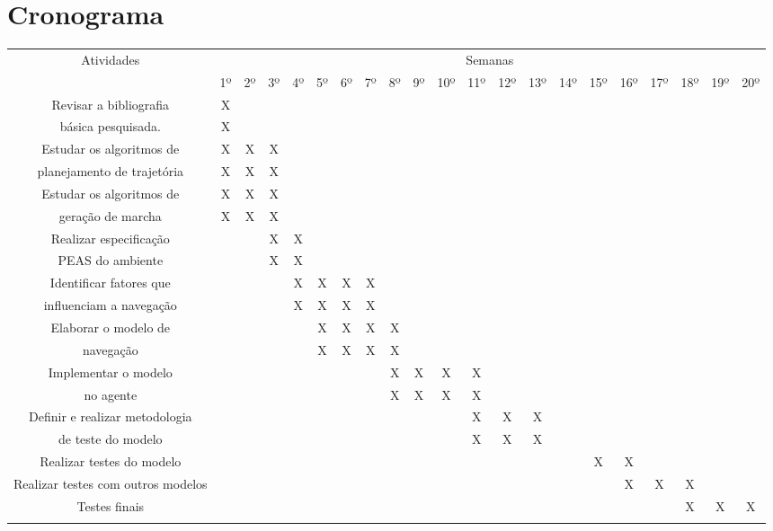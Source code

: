 \documentclass[font=plain]{abnt}
\begin{document}
\section{Cronograma}
\begin{landscape}
    
    
    \begin{tabular}{|c|| c c c c c c c c c c c c c c c c c c c c|} 
    \hline 
    Atividades & \multicolumn{20}{c|}{Semanas} \\ 
	       & 1º & 2º & 3º & 4º & 5º & 6º & 7º & 8º & 9º & 10º & 11º & 12º & 13º & 14º & 15º & 16º & 17º & 18º & 19º & 20º\\ 
    \hline 
    \hline 
    Revisar a bibliografia		&X& & & & & & & & & & & & & & & & & & &  \\%
    básica pesquisada.			&X&& & & & & & & & & & & & & & & & & &  \\
    \hline 
    Estudar os algoritmos de  		&X&X&X& & & & & & & & & & & & & & & & &  \\%
    planejamento de trajetória		&X&X&X& & & & & & & & & & & & & & & & &  \\
    \hline
    Estudar os algoritmos de 		&X&X&X& & & & & & & & & & & & & & & & &  \\%
    geração de marcha			&X&X&X& & & & & & & & & & & & & & & & &  \\
    \hline 
    Realizar especificação		& & &X&X& & & & & & & & & & & & & & & &  \\%
    PEAS do ambiente			& & &X&X& & & & & & & & & & & & & & & &  \\
    \hline 
    Identificar fatores que   		& & & &X&X&X&X& & & & & & & & & & & & &  \\%
    influenciam a navegação		& & & &X&X&X&X& & & & & & & & & & & & &  \\
    \hline 
    Elaborar o modelo de 		& & & & &X&X&X&X& & & & & & & & & & & &  \\%
    navegação				& & & & &X&X&X&X& & & & & & & & & & & &  \\
   \hline 
    Implementar o modelo 		& & & & & & & &X&X&X&X& & & & & & & & &  \\%
    no agente				& & & & & & & &X&X&X&X& & & & & & & & &  \\
    \hline 
    Definir e realizar metodologia	& & & & & & & & & & &X&X&X& & & & & & &  \\%
    de teste do modelo  		& & & & & & & & & & &X&X&X& & & & & & &  \\
    \hline 
    Realizar testes do modelo		& & & & & & & & & & & & & & &X&X& & & & \\%
    \hline
    Realizar testes com outros modelos  & & & & & & & & & & & & & & & &X&X&X& & \\%
    \hline 
    Testes finais			& & & & & & & & & & & & & & & & & &X&X&X \\ \\%
    
\hline
    \end{tabular}
\label{tab:Cronograma}
\end{landscape}









\end{document}
